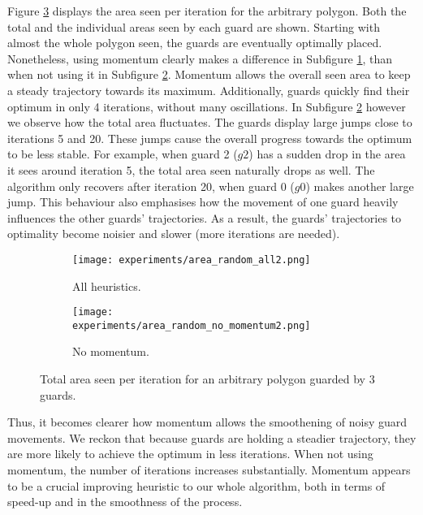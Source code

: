 \newpage
Figure \ref{fig:no_momentum} displays the area seen per iteration for the arbitrary polygon. Both the total and the individual areas seen by each guard are shown. Starting with almost the whole polygon seen, the guards are eventually optimally placed. Nonetheless, using momentum clearly makes a difference in Subfigure \ref{fig:no_momentum1}, than when not using it in Subfigure \ref{fig:no_momentum2}. Momentum allows the overall seen area to keep a steady trajectory towards its maximum. Additionally, guards quickly find their optimum in only 4 iterations, without many oscillations. In Subfigure \ref{fig:no_momentum2} however we  observe how the total area fluctuates. The guards display large jumps close to iterations 5 and 20. These jumps cause the overall progress towards the optimum to be less stable. For example, when guard 2 ($g2$) has a sudden drop in the area it sees around iteration 5, the total area seen naturally drops as well. The algorithm only recovers after iteration 20, when guard 0 ($g0$) makes another large jump. This behaviour also emphasises how the movement of one guard heavily influences the other guards' trajectories. As a result, the guards' trajectories to optimality become noisier and slower (more iterations are needed).


\begin{figure}[h!]
    \centering
    \begin{subfigure}{0.45\textwidth}
        \texttt{[image: experiments/area\_random\_all2.png]}
        \caption{All heuristics.}
        \label{fig:no_momentum1}
    \end{subfigure}
    \begin{subfigure}{0.45\textwidth}
        \texttt{[image: experiments/area\_random\_no\_momentum2.png]}
        \caption{No momentum.}
        \label{fig:no_momentum2}
    \end{subfigure}
    \caption{Total area seen per iteration for an arbitrary polygon guarded by 3 guards.}
    \label{fig:no_momentum}
\end{figure}

Thus, it becomes clearer how momentum allows the smoothening of noisy guard movements. We reckon that because guards are holding a steadier trajectory, they are more likely to achieve the optimum in less iterations. When not using momentum, the number of iterations increases substantially. Momentum appears to be a crucial improving heuristic to our whole algorithm, both in terms of speed-up and in the smoothness of the process.



